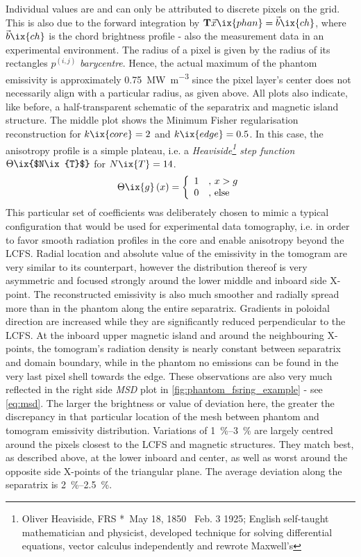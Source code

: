             Individual values are and can only be attributed to discrete pixels on the grid. This is also due to the forward integration by $\mathbf{T}\vec{x}\ix{phan}=\vec{b}\ix{ch}$, where $\vec{b}\ix{ch}$ is the chord brightness profile - also the measurement data in an experimental environment. The radius of a pixel is given by the radius of its rectangles $p^{\left(i,j\right)}$ \textit{barycentre}. Hence, the actual maximum of the phantom emissivity is approximately \SI{0.75}{\mega\watt\per\cubic\meter} since the pixel layer's center does not necessarily align with a particular radius, as given above. All plots also indicate, like before, a half-transparent schematic of the separatrix and magnetic island structure. The middle plot shows the Minimum Fisher regularisation reconstruction for $k\ix{core}=2$ and $k\ix{edge}=0.5$. In this case, the anisotropy profile is a simple plateau, i.e. a \textit{Heaviside\footnote[1]{Oliver Heaviside, FRS *~May 18, 1850 \textdagger~Feb. 3 1925; English self-taught mathematician and physicist, developed technique for solving differential equations, vector calculus independently and rewrote Maxwell's} step function} $\Theta\ix{$N\ix{T}$}$ for $N\ix{T}=14$.%
%
            \begin{align}%
                \Theta\ix{g}\left(x\right)=\left\{\begin{array}{ll}%
                    1&,\,x>g\\%
                    0&,\,\text{else}%
                \end{array}\right.\nonumber%
            \end{align}%
%
            This particular set of coefficients was deliberately chosen to mimic a typical configuration that would be used for experimental data tomography, i.e. in order to favor smooth radiation profiles in the core and enable anisotropy beyond the LCFS. Radial location and absolute value of the emissivity in the tomogram are very similar to its counterpart, however the distribution thereof is very asymmetric and focused strongly around the lower middle and inboard side X-point. The reconstructed emissivity is also much smoother and radially spread more than in the phantom along the entire separatrix. Gradients in poloidal direction are increased while they are significantly reduced perpendicular to the LCFS. At the inboard upper magnetic island and around the neighbouring X-points, the tomogram's radiation density is nearly constant between separatrix and domain boundary, while in the phantom no emissions can be found in the very last pixel shell towards the edge. These observations are also very much reflected in the right side \textit{MSD} plot in \cref{fig:phantom_fsring_example} - see \cref{eq:msd}. The larger the brightness or value of deviation here, the greater the discrepancy in that particular location of the mesh between phantom and tomogram emissivity distribution. Variations of \SIrange{1}{3}{\percent} are largely centred around the pixels closest to the LCFS and magnetic structures. They match best, as described above, at the lower inboard and center, as well as worst around the opposite side X-points of the triangular plane. The average deviation along the separatrix is \SIrange{2}{2.5}{\percent}.\\%
